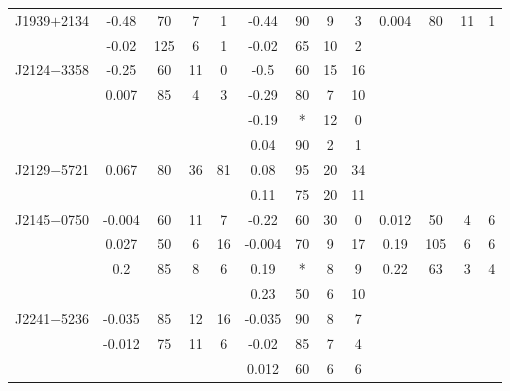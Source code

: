 \documentclass[useAMS,usenatbib]{mn2e}
\begin{document}
\begin{table}
\begin{tabular}{lcccccccccccc}
J1939$+$2134    & -0.48  & 70         & 7     & 1    & -0.44  &  90        & 9       & 3       & 0.004  &  80        &  11    &  1    \\
                & -0.02  & 125        & 6     & 1    & -0.02  &  65        & 10      & 2       &        &            &        &       \\
J2124$-$3358    & -0.25  & 60         & 11    & 0    & -0.5   &  60        & 15      & 16      &        &            &        &       \\
                & 0.007  & 85         & 4     & 3    & -0.29  &  80        & 7       & 10      &        &            &        &       \\
                &        &            &       &      & -0.19  & *          & 12      & 0       &        &            &        &       \\
                &        &            &       &      & 0.04   & 90         & 2       & 1       &        &            &        &       \\
J2129$-$5721    & 0.067  & 80         & 36    & 81   & 0.08   &  95        & 20      & 34      &        &            &        &       \\
                &        &            &       &      & 0.11   &  75        & 20      & 11      &        &            &        &       \\
J2145$-$0750    & -0.004 & 60         & 11    & 7    & -0.22  &  60        & 30      & 0       & 0.012  &  50        &  4     &  6    \\
                & 0.027  & 50         & 6     & 16   & -0.004 &  70        & 9       & 17      & 0.19   &  105       &  6     &  6    \\
                & 0.2    & 85         & 8     & 6    & 0.19   & *          & 8       & 9       & 0.22   &  63        &  3     &  4    \\
                &        &            &       &      & 0.23   & 50         & 6       & 10      &        &            &        &       \\
J2241$-$5236    & -0.035 & 85         & 12    & 16   & -0.035 & 90         & 8       & 7       &        &            &        &       \\
                & -0.012 & 75         & 11    & 6    & -0.02  & 85         & 7       & 4       &        &            &        &       \\
                &        &            &       &      & 0.012  & 60         & 6       & 6       &        &            &        &       \\

\end{tabular}
\end{table}
\end{document}
